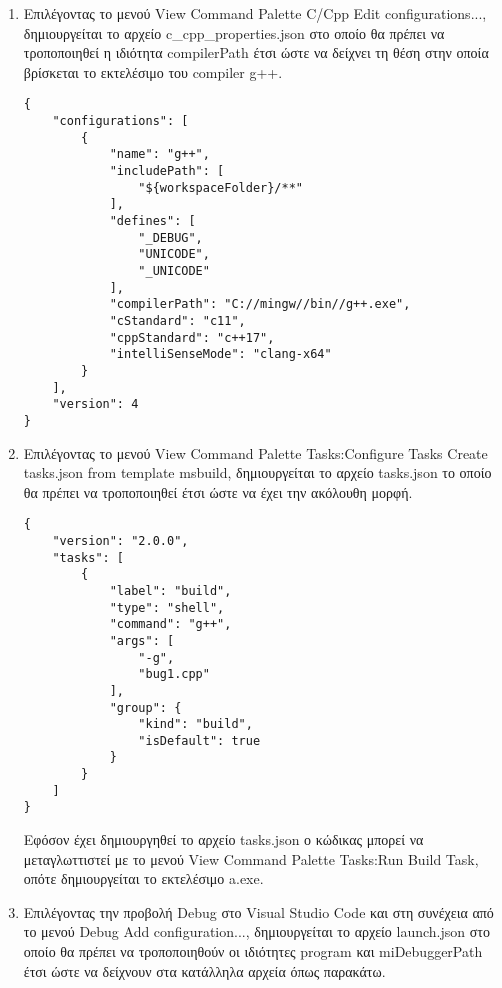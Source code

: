\begin{enumerate}
\item Επιλέγοντας το μενού View \textrightarrow Command Palette \textrightarrow C/Cpp Edit configurations..., δημιουργείται το αρχείο c\_cpp\_properties.json στο οποίο θα πρέπει να τροποποιηθεί η ιδιότητα compilerPath έτσι ώστε να δείχνει τη θέση στην οποία βρίσκεται το εκτελέσιμο του compiler g++.

\begin{lstlisting}[style=DOS,caption=c\_cpp\_properties.json]
{
    "configurations": [
        {
            "name": "g++",
            "includePath": [
                "${workspaceFolder}/**"
            ],
            "defines": [
                "_DEBUG",
                "UNICODE",
                "_UNICODE"
            ],
            "compilerPath": "C://mingw//bin//g++.exe",
            "cStandard": "c11",
            "cppStandard": "c++17",
            "intelliSenseMode": "clang-x64"
        }
    ],
    "version": 4
}
\end{lstlisting}

\item Επιλέγοντας το μενού View \textrightarrow Command Palette \textrightarrow Tasks:Configure Tasks \textrightarrow Create tasks.json from template \textrightarrow msbuild, δημιουργείται το αρχείο tasks.json το οποίο θα πρέπει να τροποποιηθεί έτσι ώστε να έχει την ακόλουθη μορφή.

\begin{lstlisting}[style=DOS,caption=tasks.json]
{
    "version": "2.0.0",
    "tasks": [
        {
            "label": "build",
            "type": "shell",
            "command": "g++",
            "args": [
                "-g",
                "bug1.cpp"
            ],
            "group": {
                "kind": "build",
                "isDefault": true
            }
        }
    ]
}
\end{lstlisting}

Εφόσον έχει δημιουργηθεί το αρχείο tasks.json ο κώδικας μπορεί να μεταγλωττιστεί με το  μενού View \textrightarrow Command Palette \textrightarrow Tasks:Run Build Task, οπότε δημιουργείται το εκτελέσιμο a.exe.

\item Επιλέγοντας την προβολή Debug στο Visual Studio Code και στη συνέχεια από το μενού Debug \textrightarrow Add configuration..., δημιουργείται το αρχείο launch.json στο οποίο θα πρέπει να τροποποιηθούν οι ιδιότητες program και miDebuggerPath έτσι ώστε να δείχνουν στα κατάλληλα αρχεία όπως παρακάτω.  


\end{enumerate}

